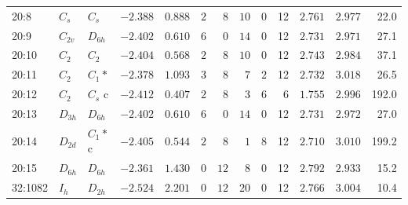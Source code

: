 \begin{table}[ht!]
\begin{tabular}{lllrrrrrrrrrr}
20:8    & $C_s$    & $C_{s }$  & $-2.388$ & $0.888$  & $2$ & $8$  & $10$ & $0$ & 12 & $2.761$ & $2.977$  &  22.0 \\
20:9    & $C_{2v}$ & $D_{6h}$  & $-2.402$ & $0.610$  & $6$ & $0$  & $14$ & $0$ & 12 & $2.731$ & $2.971$  &  27.1 \\
20:10   & $C_2$    & $C_{2 }$  & $-2.404$ & $0.568$  & $2$ & $8$  & $10$ & $0$ & 12 & $2.743$ & $2.984$  &  37.1 \\
20:11   & $C_2$    & $C_{1 }*$ & $-2.378$ & $1.093$  & $3$ & $8$  & $7$  & $2$ & 12 & $2.732$ & $3.018$  &  26.5 \\ %
20:12   & $C_2$    & $C_s$ c   & $-2.412$ & $0.407$  & $2$ & $8$  & $3$  & $6$ & 6  & $1.755$ & $2.996$  &  192.0\\
20:13   & $D_{3h}$ & $D_{6h}$  & $-2.402$ & $0.610$  & $6$ & $0$  & $14$ & $0$ & 12 & $2.731$ & $2.972$  &  27.0 \\
20:14   & $D_{2d}$ & $C_1*$ c  & $-2.405$ & $0.544$  & $2$ & $8$  & $1$  & $8$ & 12 & $2.710$ & $3.010$  &  199.2\\ %
20:15   & $D_{6h}$ & $D_{6h}$  & $-2.361$ & $1.430$  & $0$ & $12$ & $8$  & $0$ & 12 & $2.792$ & $2.933$  &  15.2 \\
32:1082 & $I_h$    & $D_{2h}$  & $-2.524$ & $2.201$  & $0$ & $12$ & $20$ & $0$ & 12 & $2.766$ & $3.004$  &  10.4     \\
		\bottomrule
	\end{tabular}
	\label{tab:anion}
\end{table}


